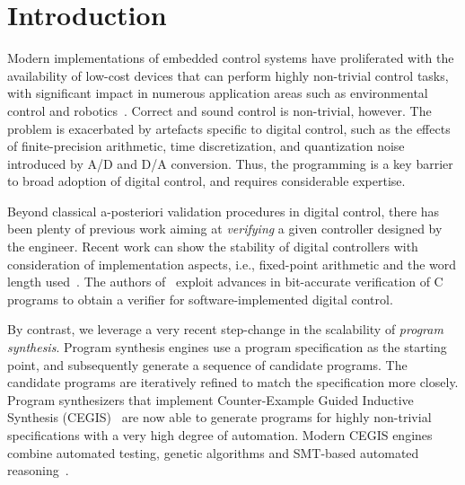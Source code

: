 \documentclass[final]{sig-alternate-05-2015}
\begin{document}
%
%
\printccsdesc



\section{Introduction}

Modern implementations of embedded control systems have proliferated with the
availability of low-cost devices that can perform highly non-trivial control
tasks, with significant impact in numerous application areas such as
environmental control and robotics~\cite{astrom1997computer, Franklin15}.
Correct and sound control is non-trivial, however. The problem is exacerbated by
artefacts specific to digital control, such as the effects of
finite-precision arithmetic, time discretization, and quantization noise
introduced by A/D and D/A conversion.  Thus, the programming is a key
barrier to broad adoption of digital control, and requires considerable
expertise.

Beyond classical a-posteriori validation procedures in digital control,
there has been plenty of previous work aiming at \emph{verifying} a given
controller designed by the engineer.  Recent work can show the stability of
digital controllers with consideration of implementation aspects, i.e.,
fixed-point arithmetic and the word length used~\cite{Bessa16}.  The authors
of~\cite{Bessa16} exploit advances in bit-accurate verification of C
programs to obtain a verifier for software-implemented digital control.

By contrast, we leverage a very recent step-change in the scalability of
\emph{program synthesis}.  Program synthesis engines use a program
specification as the starting point, and subsequently generate a sequence of
candidate programs.  The candidate programs are iteratively refined to match
the specification more closely.  Program synthesizers that implement
Counter-Example Guided Inductive Synthesis (CEGIS)~\cite{sketch} are now
able to generate programs for highly non-trivial specifications with a very
high degree of automation.  Modern CEGIS engines combine automated testing,
genetic algorithms and SMT-based automated
reasoning~\cite{DBLP:conf/lpar/DavidKL15, DBLP:conf/cav/0001A14}.
\end{document}
